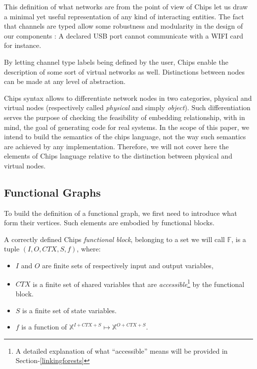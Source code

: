 \documentclass[runningheads]{llncs}
\newcommand{\noteag}[1]{\notemar{ag}{#1}}
\newcommand{\F}{\mathbb{F}}
\begin{document}
This definition of what networks are from the point of view of Chips let us draw a minimal yet useful representation of any kind of interacting entities. The fact that channels are typed allow some robustness and modularity in the design of our components : A declared USB port cannot communicate with a WIFI card for instance.

\begin{remark}\label{rem:VirtualNetwork}
    By letting channel type labels being defined by the user, Chips enable the description of some sort of virtual networks as well. Distinctions between nodes can be made at any level of abstraction.
\end{remark}

\begin{remark}\label{rem:PhysicalVirtualDistinction}
    Chips syntax allows to differentiate network nodes in two categories, physical and virtual nodes (respectively called \emph{physical} and simply \emph{object}). Such differentiation serves the purpose of checking the feasibility of embedding relationship, with in mind, the goal of generating code for real systems. In the scope of this paper, we intend to build the semantics of the chips language, not the way such semantics are achieved by any implementation. Therefore, we will not cover here the elements of Chips language relative to the distinction between physical and virtual nodes.
\end{remark}


\subsection{Functional Graphs}
\label{sec:functionalgraphs}

To build the definition of a functional graph, we first need to introduce what form their vertices. Such elements are embodied by functional blocks.

\begin{definition}\label{def:functional_block}
    A correctly defined Chips \emph{functional block}, belonging to a set we will call $\F$, is a tuple $(I, O, CTX, S, f)$, where:
    \begin{itemize}
        \item $I$ and $O$ are finite sets of respectively input and output variables,
        \item $CTX$ is a finite set of shared variables that are \emph{accessible}\footnote{A detailed explanation of what ``accessible'' means will be provided in Section-\ref{linkingforests}} by the functional block. \noteag{do so the definition is not forwarded}
        \item $S$ is a finite set of state variables.
        \item $f$ is a function of $\mathbb{X}^{I + CTX + S} \mapsto \mathbb{X}^{O + CTX + S}$.
    \end{itemize}
\end{definition}
\end{document}
